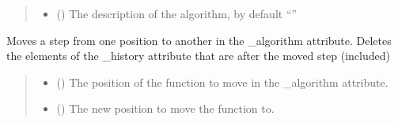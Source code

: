 \documentclass[letterpaper,10pt,english]{sphinxmanual}
\begin{document}
\begin{fulllineitems}
\begin{fulllineitems}
\begin{quote}
\begin{description}
\begin{itemize}
\item {} 
\sphinxAtStartPar
{} (\sphinxstyleliteralemphasis{\sphinxupquote{, }}) \textendash{} The description of the algorithm, by default “”

\end{itemize}

\end{description}\end{quote}

\end{fulllineitems}


\begin{fulllineitems}
\label{\detokenize{source/_autosummary/HDF5_BLS_treat.Treat_backend:HDF5_BLS_treat.Treat_backend.silent_move_step}}
\pysigstartsignatures
\pysiglinewithargsret
{}
{\sphinxparamcomma {}}
{}
\pysigstopsignatures
\sphinxAtStartPar
Moves a step from one position to another in the \_algorithm attribute. Deletes the elements of the \_history attribute that are after the moved step (included)
\begin{quote}\begin{description}
\begin{itemize}
\item {} 
\sphinxAtStartPar
{} () \textendash{} The position of the function to move in the \_algorithm attribute.

\item {} 
\sphinxAtStartPar
{} () \textendash{} The new position to move the function to.

\end{itemize}

\end{description}\end{quote}

\end{fulllineitems}


\end{fulllineitems}
\end{document}
